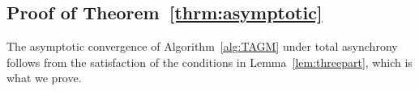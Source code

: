 \documentclass[9pt,shortpaper,twoside,web]{ieeecolor}
\newcommand{\X}{\ensuremath{\mathcal{X}}\xspace}
\newcommand{\V}{\ensuremath{\mathcal{V}}\xspace}
\begin{document}


    \subsection{Proof of Theorem~\ref{thrm:asymptotic}} \label{app:zsets}
    The asymptotic convergence of Algorithm~\ref{alg:TAGM} under total asynchrony follows from the satisfaction
    of the conditions in Lemma~\ref{lem:threepart}, which is what we prove. 
    
\end{document}
